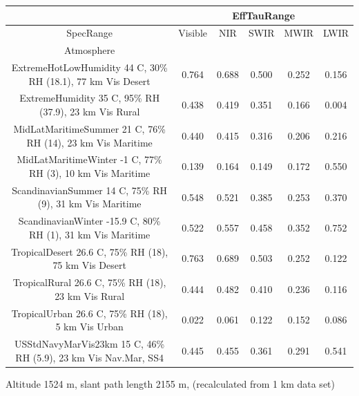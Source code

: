 \documentclass{workpackage}
\begin{document}
\begin{center}

\begin{footnotesize}

\begin{tabular}{|c|c|c|c|c|c|}
\hline
&\multicolumn{5}{|c|}{EffTauRange}\\\hline
SpecRange&Visible&NIR&SWIR&MWIR&LWIR\\\hline
Atmosphere&&&&&\\\hline
ExtremeHotLowHumidity 44 C, 30\% RH (18.1), 77 km Vis Desert&0.764&0.688&0.500&0.252&0.156\\\hline
ExtremeHumidity 35 C, 95\% RH (37.9), 23 km Vis Rural&0.438&0.419&0.351&0.166&0.004\\\hline
MidLatMaritimeSummer 21 C, 76\% RH (14), 23 km Vis Maritime&0.440&0.415&0.316&0.206&0.216\\\hline
MidLatMaritimeWinter -1 C, 77\% RH (3), 10 km Vis Maritime&0.139&0.164&0.149&0.172&0.550\\\hline
ScandinavianSummer 14 C, 75\% RH (9), 31 km Vis Maritime&0.548&0.521&0.385&0.253&0.370\\\hline
ScandinavianWinter -15.9 C, 80\% RH (1), 31 km Vis Maritime&0.522&0.557&0.458&0.352&0.752\\\hline
TropicalDesert 26.6 C, 75\% RH (18), 75 km Vis Desert&0.763&0.689&0.503&0.252&0.122\\\hline
TropicalRural 26.6 C, 75\% RH (18), 23 km Vis Rural&0.444&0.482&0.410&0.236&0.116\\\hline
TropicalUrban 26.6 C, 75\% RH (18), 5 km Vis Urban&0.022&0.061&0.122&0.152&0.086\\\hline
USStdNavyMarVis23km 15 C, 46\% RH (5.9), 23 km Vis Nav.Mar, SS4&0.445&0.455&0.361&0.291&0.541\\\hline

\end{tabular}
\end{footnotesize}
\end{center}



Altitude 1524 m, slant path length 2155 m, (recalculated from 1 km data set)
\end{document}
